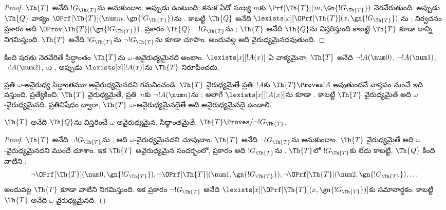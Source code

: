 \documentclass[../../../include/open-logic-section]{subfiles}
\begin{document}
\begin{proof}
$\Th{T}$ అనేది $!G_\Th{T}$ను  అనుకుందాం. అప్పుడు
 ఉంటుంది; కనుక ఏదో సంఖ్య $m$కు
$\Prf[\Th{T}](m, \Gn{!G_\Th{T}})$ నెరవేరుతుంది. అప్పుడు $\Th{Q}$ వాక్యం
$\OPrf[\Th{T}](\num m, \gn{!G_\Th{T}})$ను . కాబట్టి
$\Th{Q}$ అనేది $\lexists[x][\OPrf[\Th{T}](x,\gn{!G_\Th{T}})]$ను
; నిర్వచనం ప్రకారం అది
$\OProv[\Th{T}](\gn{!G_\Th{T}})$.  ప్రకారం $\Th{Q}$
$\lnot !G_\Th{T}$ను ; $\Th{T}$ అనేది $\Th{Q}$ను
విస్తరిస్తుంది కాబట్టి $\Th{T}$ కూడా దాన్ని నిగమిస్తుంది. $\Th{T}$ అనేది
$!G_\Th{T}$ను  $\lnot !G_\Th{T}$ను కూడా
 చూపాం.
అందువల్ల అది వైరుధ్యమైనదవుతుంది.
\end{proof}

\begin{defn}
కింది షరతు నెరవేరితే సిద్ధాంతం $\Th{T}$ను \emph{$\omega$-అవైరుధ్యమైనది} అంటాం.
$\lexists[x][!A(x)]$ ఏ వాక్యమైనా, $\Th{T}$ అనేది $\lnot !A(\num 0)$,
$\lnot !A(\num 1)$, $\lnot !A(\num 2)$, ు , అప్పుడు
$\lexists[x][!A(x)]$ను $\Th{T}$ నిరూపించదు.
\end{defn}

ప్రతి $\omega$-అవైరుధ్య సిద్ధాంతమూ అవైరుధ్యమైనదని గమనించండి. $\Th{T}$
వైరుధ్యమైతే ప్రతి~$!A$కు $\Th{T} \Proves !A$ అవుతుందనే వాస్తవం నుంచే ఇది
వస్తుంది. ప్రత్యేకించి, $\Th{T}$ వైరుధ్యమైతే, ప్రతి~$n$కు
$\lnot !A(\num n)$ను ; అలాగే
$\lexists[x][!A(x)]$ను కూడా . కాబట్టి $\Th{T}$ వైరుధ్యమైతే అది
$\omega$-వైరుధ్యమైనది. ప్రతినిషేధం ద్వారా, $\Th{T}$
$\omega$-అవైరుధ్యమైనదైతే అది అవైరుధ్యమైనదై ఉండాలి.

\begin{lem}
$\Th{T}$ అనేది $\Th{Q}$ను విస్తరించే $\omega$-అవైరుధ్యమైన,
 సిద్ధాంతమైతే,
$\Th{T} \Proves/ \lnot !G_\Th{T}$.
\end{lem}

\begin{proof}
$\Th{T}$ అనేది $\lnot !G_\Th{T}$ను , అది
$\omega$-వైరుధ్యమైనదని చూపుదాం. $\Th{T}$ అనేది $\lnot !G_\Th{T}$ను
 అనుకుందాం. $\Th{T}$ వైరుధ్యమైతే అది
$\omega$-వైరుధ్యమైనదని ముందే చూశాం. ఇక $\Th{T}$ అవైరుధ్యమైన సందర్భంలో,  ప్రకారం అది $!G_\Th{T}$ను
. $\Th{T}$లో $!G_\Th{T}$కు  లేదు కాబట్టి,
$\Th{Q}$ కింది వాటిని :
\[
\lnot \OPrf[\Th{T}](\num 0, \gn{!G_\Th{T}}), \lnot \OPrf[\Th{T}](\num 1,
\gn{!G_\Th{T}}), \lnot \OPrf[\Th{T}](\num 2, \gn{!G_\Th{T}}), \dots
\]
అందువల్ల $\Th{T}$ కూడా వాటిని నిగమిస్తుంది. ఇక 
ప్రకారం $\lnot !G_\Th{T}$ అనేది
$\lexists[x][\OPrf[\Th{T}](x,\gn{!G_\Th{T}})]$కు సమానార్థకం. కాబట్టి
$\Th{T}$ అనేది $\omega$-వైరుధ్యమైనది.
\end{proof}
\end{document}
